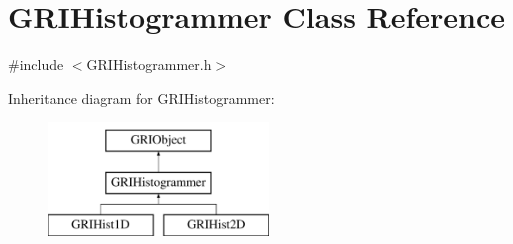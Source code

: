 \hypertarget{classGRIHistogrammer}{\section{\-G\-R\-I\-Histogrammer \-Class \-Reference}
\label{classGRIHistogrammer}
}


{\ttfamily \#include $<$\-G\-R\-I\-Histogrammer.\-h$>$}

\-Inheritance diagram for \-G\-R\-I\-Histogrammer\-:\begin{figure}[H]
\begin{center}
\leavevmode
\includegraphics[height=3.000000cm]{classGRIHistogrammer}
\end{center}
\end{figure}
